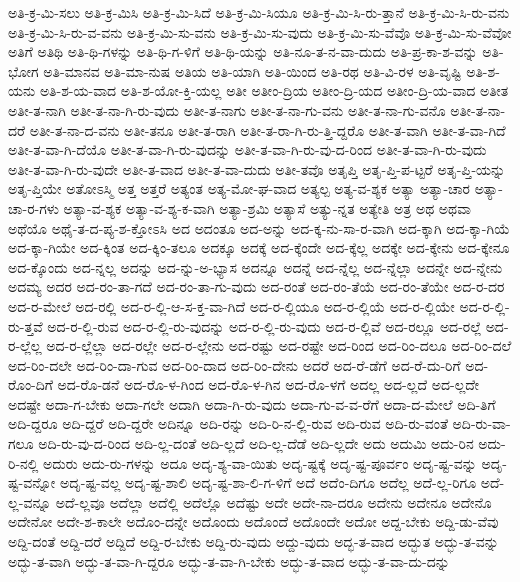 {ಅತಿ-ಕ್ರ-ಮಿ-ಸಲು
ಅತಿ-ಕ್ರ-ಮಿಸಿ
ಅತಿ-ಕ್ರ-ಮಿ-ಸಿದೆ
ಅತಿ-ಕ್ರ-ಮಿ-ಸಿಯೂ
ಅತಿ-ಕ್ರ-ಮಿ-ಸಿ-ರು-ತ್ತಾನೆ
ಅತಿ-ಕ್ರ-ಮಿ-ಸಿ-ರು-ವನು
ಅತಿ-ಕ್ರ-ಮಿ-ಸಿ-ರು-ವ-ವನು
ಅತಿ-ಕ್ರ-ಮಿ-ಸು-ವನು
ಅತಿ-ಕ್ರ-ಮಿ-ಸು-ವುದು
ಅತಿ-ಕ್ರ-ಮಿ-ಸು-ವೆವೊ
ಅತಿ-ಕ್ರ-ಮಿ-ಸು-ವೆವೋ
ಅತಿಗೆ
ಅತಿಥಿ
ಅತಿ-ಥಿ-ಗಳನ್ನು
ಅತಿ-ಥಿ-ಗ-ಳಿಗೆ
ಅತಿ-ಥಿ-ಯನ್ನು
ಅತಿ-ನೂ-ತ-ನ-ವಾ-ದುದು
ಅತಿ-ಪ್ರ-ಕಾ-ಶ-ವನ್ನು
ಅತಿ-ಭೋಗ
ಅತಿ-ಮಾನವ
ಅತಿ-ಮಾ-ನುಷ
ಅತಿಯ
ಅತಿ-ಯಾಗಿ
ಅತಿ-ಯಿಂದ
ಅತಿ-ರಥ
ಅತಿ-ವಿ-ರಳ
ಅತಿ-ವೃಷ್ಟಿ
ಅತಿ-ಶ-ಯನು
ಅತಿ-ಶ-ಯ-ವಾದ
ಅತಿ-ಶ-ಯೋ-ಕ್ತಿ-ಯಲ್ಲ
ಅತೀ
ಅತೀಂ-ದ್ರಿಯ
ಅತೀಂ-ದ್ರಿ-ಯದ
ಅತೀಂ-ದ್ರಿ-ಯ-ವಾದ
ಅತೀತ
ಅತೀ-ತ-ನಾಗಿ
ಅತೀ-ತ-ನಾ-ಗಿ-ರು-ವುದು
ಅತೀ-ತ-ನಾಗು
ಅತೀ-ತ-ನಾ-ಗು-ವನು
ಅತೀ-ತ-ನಾ-ಗು-ವನೊ
ಅತೀ-ತ-ನಾ-ದರೆ
ಅತೀ-ತ-ನಾ-ದ-ವನು
ಅತೀ-ತನೂ
ಅತೀ-ತ-ರಾಗಿ
ಅತೀ-ತ-ರಾ-ಗಿ-ರು-ತ್ತಿ-ದ್ದರೊ
ಅತೀ-ತ-ವಾಗಿ
ಅತೀ-ತ-ವಾ-ಗಿದೆ
ಅತೀ-ತ-ವಾ-ಗಿ-ದೆಯೊ
ಅತೀ-ತ-ವಾ-ಗಿ-ರು-ವುದನ್ನು
ಅತೀ-ತ-ವಾ-ಗಿ-ರು-ವು-ದ-ರಿಂದ
ಅತೀ-ತ-ವಾ-ಗಿ-ರು-ವುದು
ಅತೀ-ತ-ವಾ-ಗಿ-ರು-ವುದೇ
ಅತೀ-ತ-ವಾದ
ಅತೀ-ತ-ವಾ-ದುದು
ಅತೀ-ತವೊ
ಅತೃಪ್ತಿ
ಅತೃ-ಪ್ತಿ-ಪ-ಟ್ಟರೆ
ಅತೃ-ಪ್ತಿ-ಯನ್ನು
ಅತೃ-ಪ್ತಿಯೇ
ಅತೋಽಸ್ಮಿ
ಅತ್ತ
ಅತ್ತರೆ
ಅತ್ಯಂತ
ಅತ್ಯ-ಮೋ-ಘ-ವಾದ
ಅತ್ಯಲ್ಪ
ಅತ್ಯ-ವ-ಶ್ಯಕ
ಅತ್ಯಾ
ಅತ್ಯಾ-ಚಾರ
ಅತ್ಯಾ-ಚಾ-ರ-ಗಳು
ಅತ್ಯಾ-ವ-ಶ್ಯಕ
ಅತ್ಯಾ-ವ-ಶ್ಯ-ಕ-ವಾಗಿ
ಅತ್ಯಾ-ಶ್ರಮಿ
ಅತ್ಯಾಸೆ
ಅತ್ಯು-ನ್ನತ
ಅತ್ಯೇತಿ
ಅತ್ರ
ಅಥ
ಅಥವಾ
ಅಥೆಯೊ
ಅಥೈ-ತ-ದ-ಪ್ಯ-ಶ-ಕ್ತೋಽಸಿ
ಅದ
ಅದಂತೂ
ಅದ-ಅನ್ನು
ಅದ-ಕ್ಕ-ನು-ಸಾ-ರ-ವಾಗಿ
ಅದ-ಕ್ಕಾಗಿ
ಅದ-ಕ್ಕಾ-ಗಿಯೆ
ಅದ-ಕ್ಕಾ-ಗಿಯೇ
ಅದ-ಕ್ಕಿಂತ
ಅದ-ಕ್ಕಿಂ-ತಲೂ
ಅದಕ್ಕೂ
ಅದಕ್ಕೆ
ಅದ-ಕ್ಕೆಂದೇ
ಅದ-ಕ್ಕೆಲ್ಲ
ಅದಕ್ಕೇ
ಅದ-ಕ್ಕೇನು
ಅದ-ಕ್ಕೇನೂ
ಅದ-ಕ್ಕೊಂದು
ಅದ-ನ್ನಲ್ಲ
ಅದನ್ನು
ಅದ-ನ್ನು-ಅ-ಭ್ಯಾಸ
ಅದನ್ನೂ
ಅದನ್ನೆ
ಅದ-ನ್ನೆಲ್ಲ
ಅದ-ನ್ನೆಲ್ಲಾ
ಅದನ್ನೇ
ಅದ-ನ್ನೇನು
ಅದಮ್ಯ
ಅದರ
ಅದ-ರಂ-ತಾ-ಗದೆ
ಅದ-ರಂ-ತಾ-ಗು-ವುದು
ಅದ-ರಂತೆ
ಅದ-ರಂ-ತೆಯೆ
ಅದ-ರಂ-ತೆಯೇ
ಅದ-ರ-ದರ
ಅದ-ರ-ಮೇಲೆ
ಅದ-ರಲ್ಲಿ
ಅದ-ರ-ಲ್ಲಿ-ಆ-ಸ-ಕ್ತ-ವಾ-ಗಿದೆ
ಅದ-ರ-ಲ್ಲಿಯೂ
ಅದ-ರ-ಲ್ಲಿಯೆ
ಅದ-ರ-ಲ್ಲಿಯೇ
ಅದ-ರ-ಲ್ಲಿ-ರು-ತ್ತವೆ
ಅದ-ರ-ಲ್ಲಿ-ರುವ
ಅದ-ರ-ಲ್ಲಿ-ರು-ವುದನ್ನು
ಅದ-ರ-ಲ್ಲಿ-ರು-ವುದು
ಅದ-ರ-ಲ್ಲಿವೆ
ಅದ-ರಲ್ಲೂ
ಅದ-ರಲ್ಲೆ
ಅದ-ರ-ಲ್ಲೆಲ್ಲ
ಅದ-ರ-ಲ್ಲೆಲ್ಲಾ
ಅದ-ರಲ್ಲೇ
ಅದ-ರ-ಲ್ಲೇನು
ಅದ-ರಷ್ಟು
ಅದ-ರಷ್ಟೇ
ಅದ-ರಿಂದ
ಅದ-ರಿಂ-ದಲೂ
ಅದ-ರಿಂ-ದಲೆ
ಅದ-ರಿಂ-ದಲೇ
ಅದ-ರಿಂ-ದಾ-ಗುವ
ಅದ-ರಿಂ-ದಾದ
ಅದ-ರಿಂ-ದೇನು
ಅದರೆ
ಅದ-ರೆ-ಡೆಗೆ
ಅದ-ರೆ-ದು-ರಿಗೆ
ಅದ-ರೊಂ-ದಿಗೆ
ಅದ-ರೊ-ಡನೆ
ಅದ-ರೊ-ಳ-ಗಿಂದ
ಅದ-ರೊ-ಳ-ಗಿನ
ಅದ-ರೊ-ಳಗೆ
ಅದಲ್ಲ
ಅದ-ಲ್ಲದೆ
ಅದ-ಲ್ಲದೇ
ಅದಷ್ಟೇ
ಅದಾ-ಗ-ಬೇಕು
ಅದಾ-ಗಲೇ
ಅದಾಗಿ
ಅದಾ-ಗಿ-ರು-ವುದು
ಅದಾ-ಗು-ವ-ವ-ರೆಗೆ
ಅದಾ-ದ-ಮೇಲೆ
ಅದಿ-ತಿಗೆ
ಅದಿ-ದ್ದರೂ
ಅದಿ-ದ್ದರೆ
ಅದಿ-ದ್ದರೇ
ಅದಿನ್ನೂ
ಅದಿ-ರನ್ನು
ಅದಿ-ರಿ-ನ-ಲ್ಲಿ-ರುವ
ಅದಿ-ರುವ
ಅದಿ-ರು-ವಂತೆ
ಅದಿ-ರು-ವಾ-ಗಲೂ
ಅದಿ-ರು-ವು-ದ-ರಿಂದ
ಅದಿ-ಲ್ಲ-ದಂತೆ
ಅದಿ-ಲ್ಲದೆ
ಅದಿ-ಲ್ಲ-ದೆಡೆ
ಅದಿ-ಲ್ಲದೇ
ಅದು
ಅದುಮಿ
ಅದು-ರಿನ
ಅದು-ರಿ-ನಲ್ಲಿ
ಅದುರು
ಅದು-ರು-ಗಳನ್ನು
ಅದೂ
ಅದೃ-ಶ್ಯ-ವಾ-ಯಿತು
ಅದೃ-ಷ್ಟಕ್ಕೆ
ಅದೃ-ಷ್ಟ-ಪೂರ್ವಂ
ಅದೃ-ಷ್ಟ-ವನ್ನು
ಅದೃ-ಷ್ಟ-ವನ್ನೋ
ಅದೃ-ಷ್ಟ-ವಲ್ಲ
ಅದೃ-ಷ್ಟ-ಶಾಲಿ
ಅದೃ-ಷ್ಟ-ಶಾ-ಲಿ-ಗ-ಳಿಗೆ
ಅದೆ
ಅದೆಂ-ದಿಗೂ
ಅದೆಲ್ಲ
ಅದೆ-ಲ್ಲ-ರಿಗೂ
ಅದೆ-ಲ್ಲ-ವನ್ನೂ
ಅದೆ-ಲ್ಲವೂ
ಅದೆಲ್ಲಾ
ಅದೆಲ್ಲಿ
ಅದೆಲ್ಲೊ
ಅದೆಷ್ಟು
ಅದೇ
ಅದೇ-ನಾ-ದರೂ
ಅದೇನು
ಅದೇನೂ
ಅದೇನೊ
ಅದೇನೋ
ಅದೇ-ಶ-ಕಾಲೇ
ಅದೊಂ-ದನ್ನೇ
ಅದೊಂದು
ಅದೊಂದೆ
ಅದೊಂದೇ
ಅದೋ
ಅದ್ದ-ಬೇಕು
ಅದ್ದಿ-ಡು-ವೆವು
ಅದ್ದಿ-ದಂತೆ
ಅದ್ದಿ-ದರೆ
ಅದ್ದಿದೆ
ಅದ್ದಿ-ರ-ಬೇಕು
ಅದ್ದಿ-ರು-ವುದು
ಅದ್ದು-ವುದು
ಅದ್ಭ-ತ-ವಾದ
ಅದ್ಭುತ
ಅದ್ಭು-ತ-ವನ್ನು
ಅದ್ಭು-ತ-ವಾಗಿ
ಅದ್ಭು-ತ-ವಾ-ಗಿ-ದ್ದರೂ
ಅದ್ಭು-ತ-ವಾ-ಗಿ-ಬೇಕು
ಅದ್ಭು-ತ-ವಾದ
ಅದ್ಭು-ತ-ವಾ-ದು-ದನ್ನು
}
